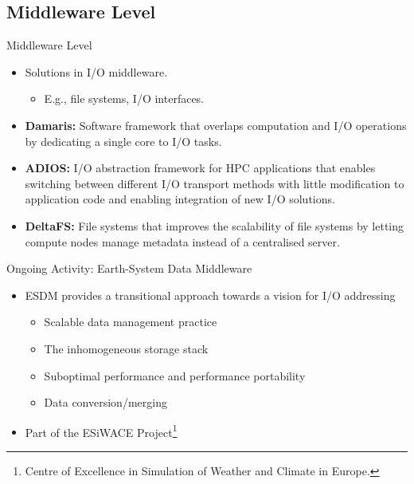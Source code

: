 \documentclass[compress,11pt,xcolor=svgnames,aspectratio=169]{beamer}
\begin{document}
\subsection{Middleware Level}

\begin{frame}[fragile]{Middleware Level}

\begin{itemize}
\setlength\itemsep{0.4cm}

\item Solutions in I/O middleware.

    \begin{itemize}

    \item E.g., file systems, I/O interfaces.

    \end{itemize}

\item \textbf{Damaris:} Software framework that overlaps computation and I/O operations by dedicating a single core to I/O tasks.

\item \textbf{ADIOS:} I/O abstraction framework for HPC applications that enables switching between different I/O transport methods with little modification to application code and enabling integration of new I/O solutions.

\item \textbf{DeltaFS:} File systems that improves the scalability of file systems by letting compute nodes manage metadata instead of a centralised server.

\end{itemize}

\nocite{3372390}

\end{frame}

\begin{frame}[fragile]{Ongoing Activity: Earth-System Data Middleware}

\begin{itemize}
\setlength\itemsep{0.4cm}

    \item ESDM provides a transitional approach towards a vision for I/O addressing\\[0.3cm]

    \begin{itemize}
    \setlength\itemsep{0.4cm}
    \item Scalable data management practice
    \item The inhomogeneous storage stack
    \item Suboptimal performance and performance portability
    \item Data conversion/merging

    \end{itemize}

    \item Part of the ESiWACE Project\footnote{Centre of Excellence in Simulation of Weather and Climate in Europe.}

\end{itemize}

\end{frame}
\end{document}
